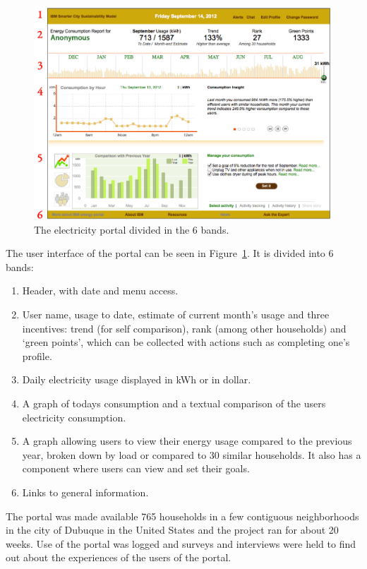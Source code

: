 \documentclass[journal]{vgtc}                %
\begin{document}
\begin{figure}[h]
	\centering
	\includegraphics[scale=0.26]{./electricity_portal.png}
	\caption{The electricity portal divided in the 6 bands.}
	\label{fig:electricityportal}
\end{figure}

The user interface of the portal can be seen in Figure~\ref{fig:electricityportal}. It is divided into 6 bands:
\begin{enumerate}
\item Header, with date and menu access.
\item User name, usage to date, estimate of current month's usage and three incentives: trend (for self comparison), rank (among other households) and `green points', which can be collected with actions such as completing one's profile.
\item Daily electricity usage displayed in kWh or in dollar.
\item A graph of todays consumption and a textual comparison of the users electricity consumption.
\item A graph allowing users to view their energy usage compared to the previous year, broken down by load or compared to 30 similar households. It also has a component where users can view and set their goals.
\item Links to general information.
\end{enumerate}

The portal was made available 765 households in a few contiguous neighborhoods in the city of Dubuque in the United States and the project ran for about 20 weeks. Use of the portal was logged and surveys and interviews were held to find out about the experiences of the users of the portal.
\end{document}
